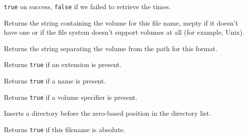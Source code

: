 
{\tt true} on success, {\tt false} if we failed to retrieve the times.

\label{wxfilenamegetvolume}


Returns the string containing the volume for this file name, mepty if it
doesn't have one or if the file system doesn't support volumes at all (for
example, Unix).

\label{wxfilenamegetvolumeseparator}


Returns the string separating the volume from the path for this format.

\label{wxfilenamehasext}


Returns {\tt true} if an extension is present.

\label{wxfilenamehasname}


Returns {\tt true} if a name is present.

\label{wxfilenamehasvolume}


Returns {\tt true} if a volume specifier is present.

\label{wxfilenameinsertdir}


Inserts a directory before the zero-based position in the directory list.

\label{wxfilenameisabsolute}


Returns {\tt true} if this filename is absolute.

\label{wxfilenameiscasesensitive}


